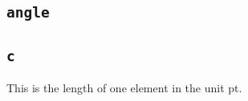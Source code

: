 \documentclass[11pt,english,BCOR10mm,DIV12,bibliography=totoc,parskip=false,
   smallheadings, headexclude,footexclude,oneside]{pst-doc}
\begin{document}
\begin{PSTexample}[pos=l]
\begin{postscript}
\end{postscript}
\end{PSTexample}



\begin{PSTexample}[pos=l]
\begin{postscript}
\end{postscript}
\end{PSTexample}

\subsection{\texttt{angle}}

\begin{PSTexample}[pos=l]
\begin{postscript}
\end{postscript}
\end{PSTexample}

\subsection{\texttt{c}}
This is the length of one element in the unit pt.

\begin{PSTexample}
\begin{postscript}
\end{postscript}
\end{PSTexample}

\begin{PSTexample}
\begin{postscript}
\end{postscript}
\end{PSTexample}
\end{document}

